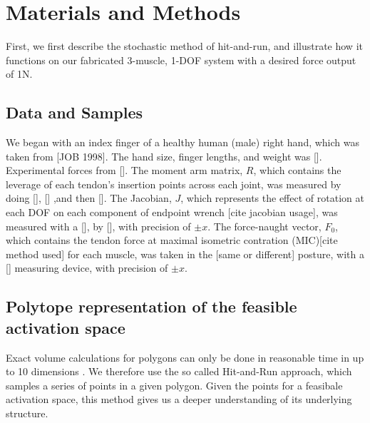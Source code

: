 \section{Materials and Methods}

First, we first describe the stochastic method of hit-and-run, and illustrate how it functions on our fabricated 3-muscle, 1-DOF system with a desired force output of 1N.




\subsection{Data and Samples}
We began with an index finger of a healthy human (male) right hand, which was taken from [JOB 1998]. The hand size, finger lengths, and weight was []. Experimental forces from []. 
The moment arm matrix, $R$, which contains the leverage of each tendon's insertion points across each joint, was measured by doing [], [] ,and then [].
The Jacobian, $J$, which represents the effect of rotation at each DOF on each component of endpoint wrench [cite jacobian usage], was measured with a [], by [], with precision of $\pm x$.
The force-naught vector, $F_0$, which contains the tendon force at maximal isometric contration (MIC)[cite method used] for each muscle, was taken in the [same or different] posture, with a [] measuring device, with precision of $\pm x$.



\subsection{Polytope representation of the feasible activation space}
Exact volume calculations for polygons can only be done in reasonable time in up to 10 dimensions \cite{Dyer2, Khachiyan, Khachiyan2}. We therefore use the so called Hit-and-Run approach, which samples a series of points in a given polygon. Given the points for a feasibale activation space, this method gives us a deeper understanding of its underlying structure. 



